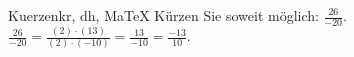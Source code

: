 \begin{MAufgabe}{Kuerzen}{kr, dh, MaTeX}
K\"urzen Sie soweit m\"oglich: $\frac{26}{-20}$.\\ 
\ifLsg\MLoesung
\quad $\frac{26}{-20}=\frac{(2)\cdot(13)}{(2)\cdot(-10)}=\frac{13}{-10}=\frac{-13}{10}$.\else\relax\fi
 \end{MAufgabe}